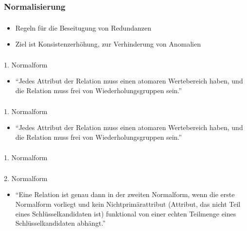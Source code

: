 \documentclass[aspectratio=169,14pt,xcolor=dvipsnames]{beamer}
\begin{document}
\subsubsection{Normalisierung}
\begin{frame}[t]
    \frametitle{\subsecname}
    \framesubtitle{\subsubsecname}
    \begin{itemize}
        \item Regeln für die Beseitugung von Redundanzen
        \item Ziel ist Konsistenzerhöhung, zur Verhinderung von Anomalien
    \end{itemize}
\end{frame}

\begin{frame}[t]
    \frametitle{\subsecname}
    \framesubtitle{\subsubsecname}
    1. Normalform
    \begin{itemize}
        \item "`Jedes Attribut der Relation muss einen atomaren Wertebereich haben, und die Relation muss frei von Wiederholungsgruppen sein."'
    \end{itemize}
    \pause
    
\end{frame}

\begin{frame}[t]
    \frametitle{\subsecname}
    \framesubtitle{\subsubsecname}
    1. Normalform
    \begin{itemize}
        \item "`Jedes Attribut der Relation muss einen atomaren Wertebereich haben, und die Relation muss frei von Wiederholungsgruppen sein."'
    \end{itemize}
    
\end{frame}

\begin{frame}[t]
    \frametitle{\subsecname}
    \framesubtitle{\subsubsecname}
    1. Normalform
    
\end{frame}

\begin{frame}[t]
    \frametitle{\subsecname}
    \framesubtitle{\subsubsecname}
    2. Normalform
    \begin{itemize}
        \item "`Eine Relation ist genau dann in der zweiten Normalform, wenn die erste Normalform vorliegt und kein Nichtprimärattribut (Attribut, das nicht Teil eines Schlüsselkandidaten ist) funktional von einer echten Teilmenge eines Schlüsselkandidaten abhängt."'
    \end{itemize}
    \pause 
    
\end{frame}
\end{document}
